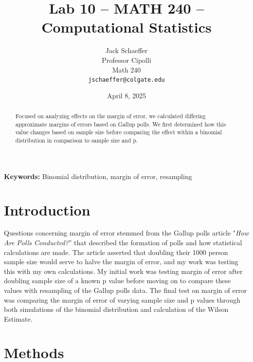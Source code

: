 \documentclass{article}\usepackage[]{graphicx}\usepackage[]{xcolor}
\begin{document}
\vspace{-1in}
\title{Lab 10 -- MATH 240 -- Computational Statistics}

\author{
  Jack Schaeffer \\
  Professor Cipolli  \\
  Math 240  \\
  {\tt jschaeffer@colgate.edu}
}

\date{April 8, 2025}

\maketitle

\begin{multicols}{2}
\begin{abstract}

Focused on analyzing effects on the margin of error, we calculated differing approximate margins of errors based on Gallup polls. We first determined how this value changes based on sample size before comparing the effect within a binomial distribution in comparison to sample size and p.
\end{abstract}

\noindent \textbf{Keywords:} Binomial distribution, margin of error, resampling

\section{Introduction}

Questions concerning margin of error stemmed from the Gallup polls article "\textit{How Are Polls Conducted?}'' that described the formation of polls and how statistical calculations are made. The article asserted that doubling their 1000 person sample size would serve to halve the margin of error, and my work was testing this with my own calculations. My initial work was testing margin of error after doubling sample size of a known p value before moving on to compare these values with resampling of the Gallup polls data. The final test on margin of error was comparing the margin of error of varying sample size and p values through both simulations of the binomial distribution and calculation of the Wilson Estimate.

\section{Methods}


\end{multicols}
\end{document}

